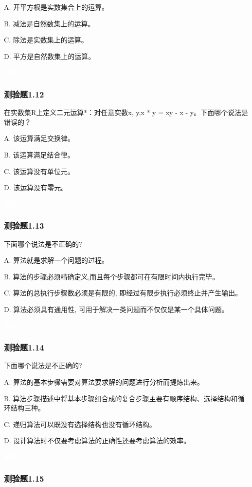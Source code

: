 \documentclass[UTF8, heading=true]{ctexart}
\begin{document}
A. 开平方根是实数集合上的运算。

B. 减法是自然数集上的运算。

C. 除法是实数集上的运算。

D. 平方是自然数集上的运算。

\textcolor{white}{答案：D}

\subsubsection{测验题1.12}

在实数集R上定义二元运算*：对任意实数x, y,x * y = xy - x - y。下面哪个说法是错误的？

A. 该运算满足交换律。

B. 该运算满足结合律。

C. 该运算没有单位元。

D. 该运算没有零元。

\textcolor{white}{答案：B}

\subsubsection{测验题1.13}

下面哪个说法是不正确的?

A. 算法就是求解一个问题的过程。

B. 算法的步骤必须精确定义,而且每个步骤都可在有限时间内执行完毕。

C. 算法的总执行步骤数必须是有限的, 即经过有限步执行必须终止并产生输出。

D. 算法必须具有通用性, 可用于解决一类问题而不仅仅是某一个具体问题。

\textcolor{white}{答案：A}

\subsubsection{测验题1.14}

下面哪个说法是不正确的?

A. 算法的基本步骤需要对算法要求解的问题进行分析而提炼出来。

B. 算法步骤描述中将基本步骤组合成的复合步骤主要有顺序结构、选择结构和循环结构三种。

C. 递归算法可以既没有选择结构也没有循环结构。

D. 设计算法时不仅要考虑算法的正确性还要考虑算法的效率。

\textcolor{white}{答案：C}

\subsubsection{测验题1.15}
\end{document}

